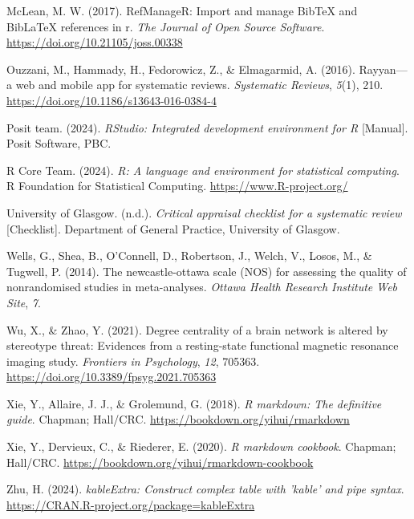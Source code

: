 \documentclass[
  stu]{apa7}
\newlength{\cslhangindent}
\newenvironment{CSLReferences}[2] %
 {\begin{list}{}{%
  \setlength{\itemindent}{0pt}
  \setlength{\leftmargin}{0pt}
  \setlength{\parsep}{0pt}
  \ifodd #1
   \setlength{\leftmargin}{\cslhangindent}
   \setlength{\itemindent}{-1\cslhangindent}
  \fi
  \setlength{\itemsep}{#2\baselineskip}}}
 {\end{list}}
\begin{document}
\begin{CSLReferences}{1}{0}
McLean, M. W. (2017). RefManageR: Import and manage BibTeX and BibLaTeX references in r. \emph{The Journal of Open Source Software}. \url{https://doi.org/10.21105/joss.00338}

Ouzzani, M., Hammady, H., Fedorowicz, Z., \& Elmagarmid, A. (2016). Rayyan---a web and mobile app for systematic reviews. \emph{Systematic Reviews}, \emph{5}(1), 210. \url{https://doi.org/10.1186/s13643-016-0384-4}

Posit team. (2024). \emph{{RStudio}: {Integrated} development environment for {R}} {[}Manual{]}. Posit Software, PBC.

R Core Team. (2024). \emph{R: A language and environment for statistical computing}. R Foundation for Statistical Computing. \url{https://www.R-project.org/}

University of Glasgow. (n.d.). \emph{Critical appraisal checklist for a systematic review} {[}Checklist{]}. Department of General Practice, University of Glasgow.

Wells, G., Shea, B., O'Connell, D., Robertson, J., Welch, V., Losos, M., \& Tugwell, P. (2014). The newcastle-ottawa scale ({NOS}) for assessing the quality of nonrandomised studies in meta-analyses. \emph{Ottawa Health Research Institute Web Site}, \emph{7}.

Wu, X., \& Zhao, Y. (2021). Degree centrality of a brain network is altered by stereotype threat: {Evidences} from a resting-state functional magnetic resonance imaging study. \emph{Frontiers in Psychology}, \emph{12}, 705363. \url{https://doi.org/10.3389/fpsyg.2021.705363}

Xie, Y., Allaire, J. J., \& Grolemund, G. (2018). \emph{R markdown: The definitive guide}. Chapman; Hall/CRC. \url{https://bookdown.org/yihui/rmarkdown}

Xie, Y., Dervieux, C., \& Riederer, E. (2020). \emph{R markdown cookbook}. Chapman; Hall/CRC. \url{https://bookdown.org/yihui/rmarkdown-cookbook}

Zhu, H. (2024). \emph{kableExtra: Construct complex table with 'kable' and pipe syntax}. \url{https://CRAN.R-project.org/package=kableExtra}

\end{CSLReferences}


\clearpage
\renewcommand{\listfigurename}{Figure captions}

\clearpage
\renewcommand{\listtablename}{Table captions}
\end{document}
